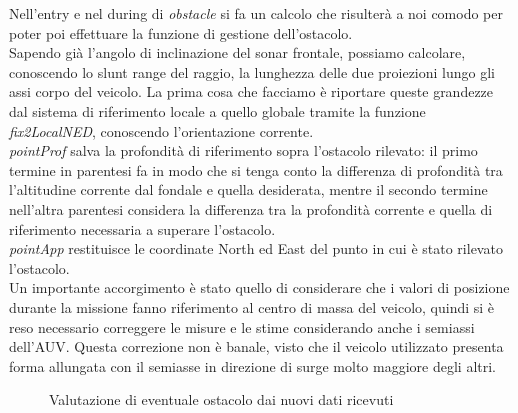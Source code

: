 \documentclass{article}
\begin{document}
            Nell'entry e nel during di \emph{obstacle} si fa un calcolo che risulterà a noi comodo per poter poi effettuare la funzione di gestione dell'ostacolo.\\
            Sapendo già l'angolo di inclinazione del sonar frontale, possiamo calcolare, conoscendo lo slunt range del raggio, la lunghezza delle due proiezioni 
            lungo gli assi corpo del veicolo. La prima cosa che facciamo è riportare queste grandezze dal sistema di riferimento
            locale a quello globale tramite la funzione \emph{fix2LocalNED}, conoscendo l'orientazione corrente.\\
            \emph{pointProf} salva la profondità di riferimento sopra l'ostacolo rilevato: il primo termine in parentesi fa in modo che si tenga conto
            la differenza di profondità tra l'altitudine corrente dal fondale e quella desiderata, mentre il secondo termine nell'altra parentesi 
            considera la differenza tra la profondità corrente e quella di riferimento necessaria a superare l'ostacolo.\\
            \emph{pointApp} restituisce le coordinate North ed East del punto in cui è stato rilevato l'ostacolo. 
            \\
            Un importante accorgimento è stato quello di considerare che i valori di posizione durante la missione fanno riferimento al centro di massa del veicolo, quindi 
            si è reso necessario correggere le misure e le stime considerando anche i semiassi dell'AUV. Questa correzione non è banale, visto che il veicolo utilizzato
            presenta forma allungata con il semiasse in direzione di surge molto maggiore degli altri.

            \begin{figure} [ht]
                \caption{Valutazione di eventuale ostacolo dai nuovi dati ricevuti}
                \label{fig:obs1}
            \end{figure}
\end{document}
